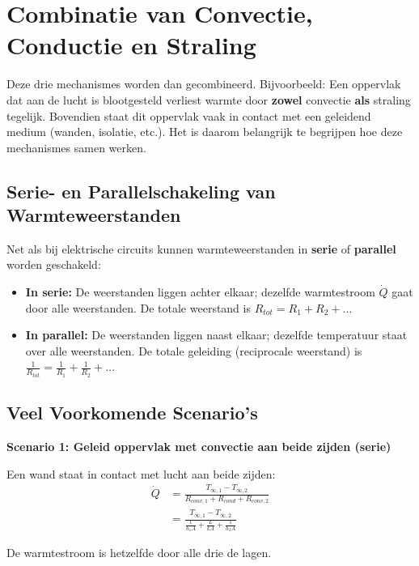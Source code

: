 \documentclass[a4paper,11pt,twoside]{report}
\begin{document}
\section{Combinatie van Convectie, Conductie en Straling}

Deze drie mechanismes worden dan gecombineerd. Bijvoorbeeld:
 Een oppervlak dat aan de lucht is blootgesteld verliest warmte 
 door \textbf{zowel} convectie \textbf{als} straling tegelijk. 
 Bovendien staat dit oppervlak vaak in contact met een geleidend 
 medium (wanden, isolatie, etc.). 
 Het is daarom belangrijk te begrijpen hoe deze mechanismes samen werken.

\subsection*{Serie- en Parallelschakeling van Warmteweerstanden}

Net als bij elektrische circuits kunnen warmteweerstanden in \textbf{serie} of \textbf{parallel} worden geschakeld:

\begin{itemize}
    \item \textbf{In serie:} De weerstanden liggen achter elkaar; dezelfde warmtestroom $\dot{Q}$ gaat door alle weerstanden. De totale weerstand is $R_{tot} = R_1 + R_2 + \ldots$
    
    \item \textbf{In parallel:} De weerstanden liggen naast elkaar; dezelfde temperatuur staat over alle weerstanden. De totale geleiding (reciprocale weerstand) is $\frac{1}{R_{tot}} = \frac{1}{R_1} + \frac{1}{R_2} + \ldots$
\end{itemize}

\subsection*{Veel Voorkomende Scenario's}

\textbf{Scenario 1: Geleid oppervlak met convectie aan beide zijden (serie)}

Een wand staat in contact met lucht aan beide zijden:
\begin{align}
\dot{Q} &= \frac{T_{\infty,1} - T_{\infty,2}}{R_{conv,1} + R_{cond} + R_{conv,2}}\\
&= \frac{T_{\infty,1} - T_{\infty,2}}{\frac{1}{h_1 A} + \frac{L}{kA} + \frac{1}{h_2 A}}
\end{align}

De warmtestroom is hetzelfde door alle drie de lagen.
\end{document}
